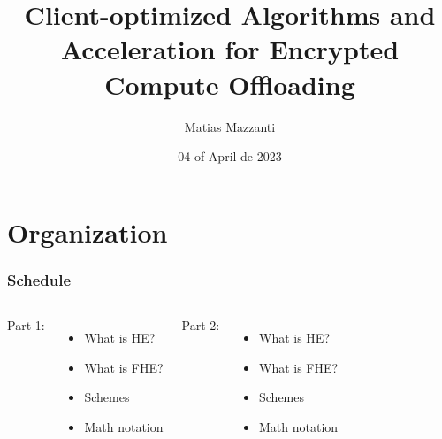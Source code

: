 \documentclass[10pt,handout]{beamer}
\title[CHACO]{Client-optimized Algorithms and Acceleration for Encrypted Compute Offloading}
\author[Matias Mazzanti]{Matias Mazzanti}
\institute{}
\date{04 of April de 2023}
\begin{document}
\begin{frame}

\maketitle

\end{frame}


\section{Organization}


%
%
%
%
%
%
%
\begin{frame}
    \frametitle{Schedule}
\begin{columns}
    Part 1:
    \begin{itemize}
        \item What is HE?
        \item What is FHE?
        \item Schemes
        \item Math notation
    \end{itemize}

    Part 2:
    \begin{itemize}
        \item What is HE?
        \item What is FHE?
        \item Schemes
        \item Math notation
    \end{itemize}
\end{columns}

\end{frame}
\end{document}
